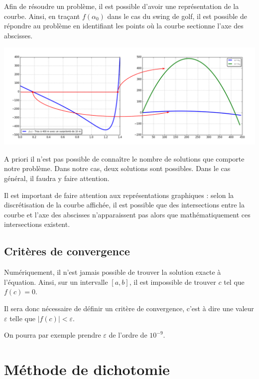 \documentclass[10pt]{article}
\begin{document}
Afin de résoudre un problème, il est possible d'avoir une représentation de la courbe. Ainsi, en traçant $f(\alpha_0)$ dans le cas du swing de golf, il est possible de répondre au problème en identifiant les points où la courbe sectionne l'axe des abscisses. 

\begin{center}
\includegraphics[width=.9\textwidth]{images/InterpretationGraphique}
\end{center}

\begin{rem}
A priori il n'est pas possible de connaître le nombre de solutions que comporte notre problème. Dans notre cas, deux solutions sont possibles. Dans le cas général, il faudra y faire attention.
\end{rem}

\begin{warn}
Il est important de faire attention aux représentations graphiques : selon la discrétisation de la courbe affichée, il est possible que des intersections entre la courbe et l'axe des abscisses n'apparaissent pas alors que mathématiquement ces intersections existent. 
\end{warn}

\subsection{Critères de convergence}

Numériquement, il n'est jamais possible de trouver la solution exacte à l'équation. Ainsi, sur un intervalle $[a,b]$, il est impossible de trouver $c$ tel que $f(c)=0$.

Il sera donc nécessaire de définir un critère de convergence, c'est à dire une valeur $\varepsilon$ telle que $|f(c)|<\varepsilon$.

On pourra par exemple prendre $\varepsilon$ de l'ordre de $10^{-9}$.

\section{Méthode de dichotomie}
\end{document}
